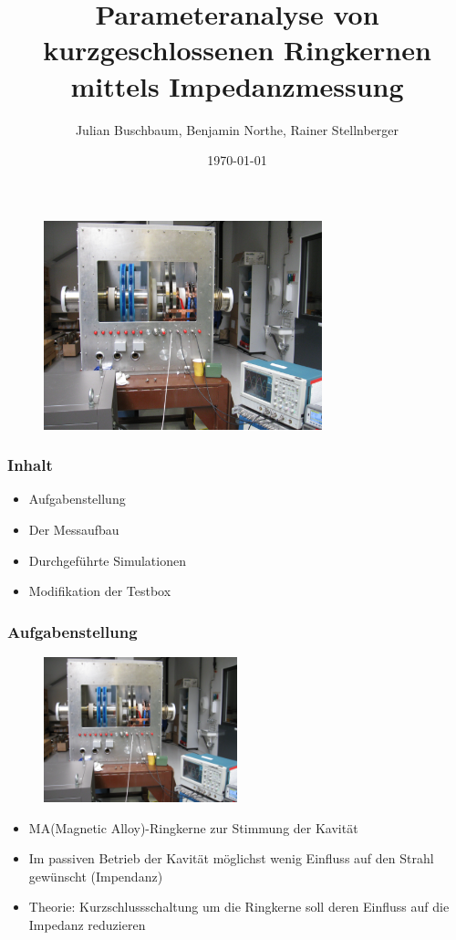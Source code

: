 \documentclass[accentcolor=tud9b, colorbacktitle, inverttitle]{tudbeamer}
\author{Julian Buschbaum, Benjamin Northe, Rainer Stellnberger}
\institute{Institut TEMF}
\date{\today}
\title{Parameteranalyse von kurzgeschlossenen Ringkernen mittels Impedanzmessung}
\begin{document}
\begin{titleframe}
\vspace{-1em}
	\begin{figure}[h]
		\centering
		\includegraphics[width=0.72\textwidth]{Kavitaet}
	\end{figure}
\end{titleframe}





\begin{frame}\frametitle{Inhalt}
	\begin{itemize}
		\item Aufgabenstellung
		\item Der Messaufbau
		\item Durchgef\"uhrte Simulationen
		\item Modifikation der Testbox
	\end{itemize}
\end{frame}


\begin{frame}\frametitle{Aufgabenstellung}
\begin{multicols}{2}
\vspace{-2em}
	\begin{figure}[h]
		\centering
		\includegraphics[width=0.5\textwidth]{Kavitaet}
	\end{figure}
	\vfill\null
	\columnbreak
	\begin{itemize}
		\item MA(Magnetic Alloy)-Ringkerne zur Stimmung der Kavit\"at
		\item Im passiven Betrieb der Kavit\"at m\"oglichst wenig Einfluss auf den Strahl gewünscht (Impendanz)
		\item Theorie: Kurzschlussschaltung um die Ringkerne soll deren Einfluss auf die Impedanz reduzieren
	\end{itemize}
\end{multicols}
\end{frame}
\end{document}
